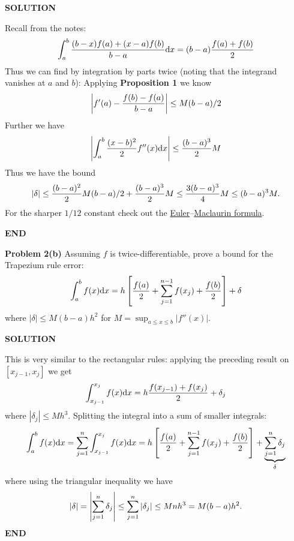 \documentclass[12pt,a4paper]{article}
\def\endash{–}
\begin{document}
\textbf{SOLUTION}

Recall from the notes:
\[
\int_a^b {(b-x) f(a) + (x-a) f(b) \over b-a} {\rm d} x = (b-a) {f(a) + f(b) \over 2}
\]
Thus we can find by integration by parts twice (noting that the integrand vanishes at $a$ and $b$):
Applying \textbf{Proposition 1} we know
\[
\left|{f'(a) - {f(b)-f(a) \over b-a}}\right| \leq M (b-a)/2
\]
Further we have
\[
\left|{\int_a^b {(x-b)^2 \over 2} f''(x) {\rm d}x }\right| \leq {(b-a)^3 \over 2} M
\]
Thus we have the bound
\[
|\ensuremath{\delta}| \ensuremath{\leq} {(b-a)^2 \over 2} M (b-a)/2 + {(b-a)^3 \over 2} M \ensuremath{\leq} {3 (b-a)^3 \over 4} M \ensuremath{\leq} (b-a)^3 M.
\]
For the sharper $1/12$ constant check out the \href{https://en.wikipedia.org/wiki/Euler\ensuremath{\endash}Maclaurin_formula}{Euler\ensuremath{\endash}Maclaurin formula}.

\textbf{END}

\textbf{Problem 2(b)} Assuming $f$ is twice-differentiable, prove a bound for the Trapezium rule error:
\[
\ensuremath{\int}_a^b f(x) {\rm d}x = h \br[{f(a) \over 2} + \ensuremath{\sum}_{j=1}^{n-1} f(x_j) + {f(b) \over 2}] +  \ensuremath{\delta}
\]
where $|\ensuremath{\delta}| \ensuremath{\leq} M (b-a) h^2$ for $M = \sup_{a \ensuremath{\leq} x \ensuremath{\leq} b}|f''(x)|$.

\textbf{SOLUTION}

This is very similar to the rectangular rules: applying the preceding result on $[x_{j-1},x_j]$ we get
\[
\ensuremath{\int}_{x_{j-1}}^{x_j} f(x) {\rm d}x = h {f(x_{j-1}) + f(x_j) \over 2} + \ensuremath{\delta}_j
\]
where $|\ensuremath{\delta}_j| \ensuremath{\leq} M h^3$. Splitting the integral into a sum of smaller integrals:
\[
\ensuremath{\int}_a^b f(x) {\rm d}x = \ensuremath{\sum}_{j=1}^n  \ensuremath{\int}_{x_{j-1}}^{x_j} f(x) {\rm d}x =
h \br[{f(a) \over 2} + \ensuremath{\sum}_{j=1}^{n-1} f(x_j) + {f(b) \over 2}] +  \underbrace{\ensuremath{\sum}_{j=1}^n \ensuremath{\delta}_j}_\ensuremath{\delta}
\]
where using the triangular inequality we have
\[
|\delta| = \left|{ \sum_{j=1}^n \delta_j}\right| \leq \sum_{j=1}^n |\delta_j| \leq M n h^3 = M(b-a) h^2.
\]
\textbf{END}
\end{document}

